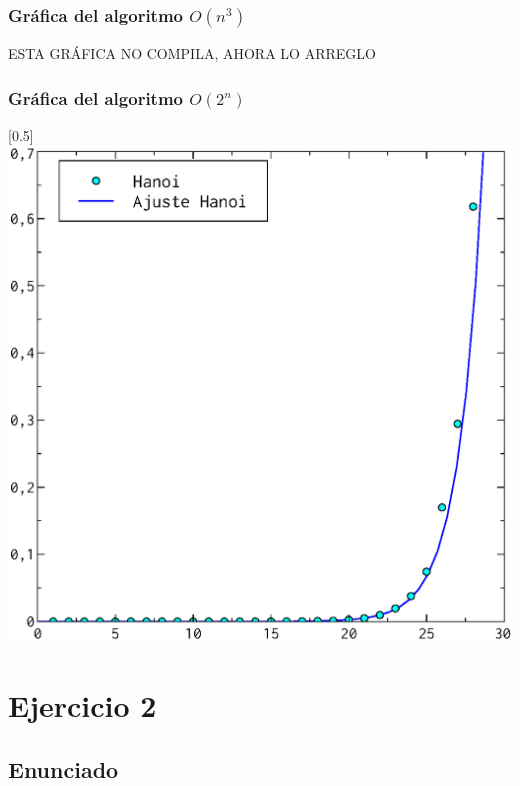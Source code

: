\documentclass[compress]{beamer}
\begin{document}
\begin{frame}
\frametitle{Gráfica del algoritmo $O(n^3)$}
	ESTA GRÁFICA NO COMPILA, AHORA LO ARREGLO
\end{frame}
\begin{frame}
\frametitle{Gráfica del algoritmo $O(2^n)$}
	\begin{center}
\scalebox{0.53}[0.5]{
    \includegraphics[]{2n_ajuste.eps}
}
\end{center}
\end{frame}


\section{Ejercicio 2}
\subsection{Enunciado}
\end{document}
